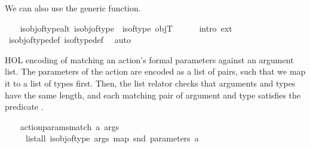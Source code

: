 \begin{isabellebody}
\begin{isamarkuptext}%
We can also use the generic  function.%
\end{isamarkuptext}\isamarkuptrue%
\ \ \isamarkupfalse%
\ is{\isacharunderscore}{\kern0pt}obj{\isacharunderscore}{\kern0pt}of{\isacharunderscore}{\kern0pt}type{\isacharunderscore}{\kern0pt}alt{\isacharcolon}{\kern0pt}\ {\isachardoublequoteopen}is{\isacharunderscore}{\kern0pt}obj{\isacharunderscore}{\kern0pt}of{\isacharunderscore}{\kern0pt}type\ {\isacharequal}{\kern0pt}\ is{\isacharunderscore}{\kern0pt}of{\isacharunderscore}{\kern0pt}type\ objT{\isachardoublequoteclose}\isanewline
%
\isadelimproof
\ \ \ \ %
\endisadelimproof
%
\isatagproof
{}\isamarkupfalse%
\ {\isacharparenleft}{\kern0pt}intro\ ext{\isacharparenright}{\kern0pt}\isanewline
\ \ \ \ \isamarkupfalse%
\ is{\isacharunderscore}{\kern0pt}obj{\isacharunderscore}{\kern0pt}of{\isacharunderscore}{\kern0pt}type{\isacharunderscore}{\kern0pt}def\ is{\isacharunderscore}{\kern0pt}of{\isacharunderscore}{\kern0pt}type{\isacharunderscore}{\kern0pt}def\ \isamarkupfalse%
\ auto%
\endisatagproof
{\isafoldproof}%
%
\isadelimproof
%
\endisadelimproof
%
\begin{isamarkuptext}%
HOL encoding of matching an action's formal parameters against an
    argument list.
    The parameters of the action are encoded as a list of  pairs,
    such that we map it to a list of types first. Then, the list
    relator  checks that arguments and types have the same
    length, and each matching pair of argument and type
    satisfies the predicate .%
\end{isamarkuptext}\isamarkuptrue%
\ \ \isamarkupfalse%
\ {\isachardoublequoteopen}action{\isacharunderscore}{\kern0pt}params{\isacharunderscore}{\kern0pt}match\ a\ args\isanewline
\ \ \ \ {\isasymequiv}\ list{\isacharunderscore}{\kern0pt}all{}\ is{\isacharunderscore}{\kern0pt}obj{\isacharunderscore}{\kern0pt}of{\isacharunderscore}{\kern0pt}type\ args\ {\isacharparenleft}{\kern0pt}map\ snd\ {\isacharparenleft}{\kern0pt}parameters\ a{\isacharparenright}{\kern0pt}{\isacharparenright}{\kern0pt}{\isachardoublequoteclose}%
\begin{isamarkuptext}%

\end{isamarkuptext}
\end{isabellebody}
